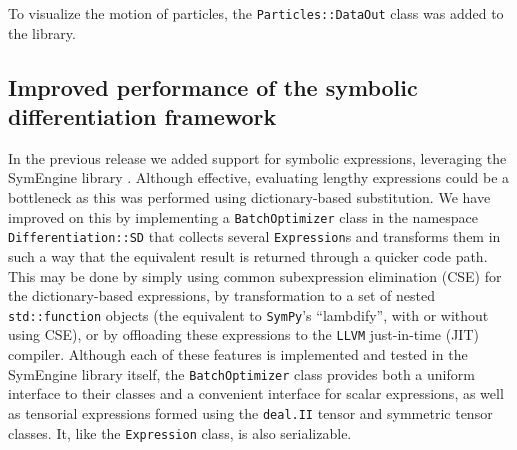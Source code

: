 \documentclass{ansarticle-preprint}
\begin{document}
To visualize the motion of particles, the \texttt{Particles::DataOut} class was added to the library.






\subsection{Improved performance of the symbolic differentiation framework}
\label{subsec:symbdiff}

In the previous release we added support for symbolic expressions, leveraging the
SymEngine library \cite{symengine-web-page}.
Although effective, evaluating lengthy expressions could be a bottleneck as this
was performed using dictionary-based substitution.
We have improved on this by implementing a \texttt{BatchOptimizer} class in the 
namespace \texttt{Differentiation::SD} that collects several \texttt{Expression}s
and transforms them in such a way that the equivalent result is returned through
a quicker code path.
This may be done by simply using common subexpression elimination (CSE) for the
dictionary-based expressions, by transformation to a set of nested 
\texttt{std::function} objects (the equivalent to \texttt{SymPy}'s ``lambdify'', with or
without using CSE), or by offloading these expressions to the \texttt{LLVM}
just-in-time (JIT) compiler.
Although each of these features is implemented and tested in the SymEngine
library itself, the \texttt{BatchOptimizer} class provides both a uniform
interface to their classes and a convenient interface for scalar expressions,
as well as tensorial expressions formed using the \texttt{deal.II} tensor and 
symmetric tensor classes.
It, like the \texttt{Expression} class, is also serializable.
\end{document}
